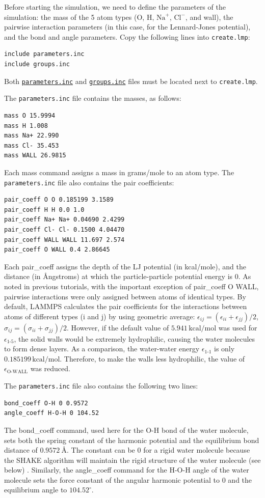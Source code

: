 \documentclass[9pt,tutorial]{livecoms}
\newcommand{\lmpcmd}[1]{\hspace{0pt}\colorbox{listing}{\textcolor{command}{\small{#1}}}\hspace{0pt}} %
\newcommand{\flecmd}[1]{\textcolor{command}{\texttt{#1}}} %
\newcommand{\dwlcmd}[1]{\textcolor{download}{\texttt{#1}}} %
\newcommand{\filepath}{https://raw.githubusercontent.com/lammpstutorials/lammpstutorials-article/main/files/}
\begin{document}
Before starting the simulation, we need to define the parameters of the
simulation: the mass of the 5 atom types (O, H, $\text{Na}^+$, $\text{Cl}^-$,
and wall), the pairwise interaction parameters (in this case, for the
Lennard-Jones potential), and the bond and angle parameters.  Copy the following
lines into \flecmd{create.lmp}:
\begin{lstlisting}
include parameters.inc
include groups.inc
\end{lstlisting}
Both \href{\filepath tutorial4/parameters.inc}{\dwlcmd{parameters.inc}}
and \href{\filepath tutorial4/groups.inc}{\dwlcmd{groups.inc}} files
must be located next to \flecmd{create.lmp}.

The \flecmd{parameters.inc} file contains the masses, as follows:
\begin{lstlisting}
mass O 15.9994
mass H 1.008
mass Na+ 22.990
mass Cl- 35.453
mass WALL 26.9815
\end{lstlisting}
Each \lmpcmd{mass} command assigns a mass in grams/mole to an atom type.
The \flecmd{parameters.inc} file also contains the pair coefficients:
\begin{lstlisting}
pair_coeff O O 0.185199 3.1589
pair_coeff H H 0.0 1.0
pair_coeff Na+ Na+ 0.04690 2.4299
pair_coeff Cl- Cl- 0.1500 4.04470
pair_coeff WALL WALL 11.697 2.574
pair_coeff O WALL 0.4 2.86645
\end{lstlisting}
Each \lmpcmd{pair\_coeff} assigns the depth of the LJ potential
(in kcal/mole), and the distance (in Ångstroms) at which the particle-particle
potential energy is 0.  As noted in previous tutorials, with the important exception of
\lmpcmd{pair\_coeff O WALL}, pairwise interactions were only assigned between
atoms of identical types.  By default, LAMMPS calculates the pair coefficients for the
interactions between atoms of different types (i and j) by using geometric average:
$\epsilon_{ij} = (\epsilon_{ii} + \epsilon_{jj})/2$,  $\sigma_{ij} = (\sigma_{ii} + \sigma_{jj})/2$.
However, if the default value of $5.941\,\text{kcal/mol}$ was used for $\epsilon_\text{1-5}$, the solid
walls would be extremely hydrophilic, causing the water molecules to form dense layers.  As a
comparison, the water-water energy $\epsilon_\text{1-1}$ is only $0.185199\,\text{kcal/mol}$.
Therefore, to make the walls less hydrophilic, the value of $\epsilon_\text{O-WALL}$
was reduced.

The \flecmd{parameters.inc} file also contains the following two lines:
\begin{lstlisting}
bond_coeff O-H 0 0.9572
angle_coeff H-O-H 0 104.52
\end{lstlisting}
The \lmpcmd{bond\_coeff} command, used here for the O-H bond of the water
molecule, sets both the spring constant of the harmonic potential and the
equilibrium bond distance of $0.9572~\text{\AA{}}$.  The constant can be 0 for a
rigid water molecule because the SHAKE algorithm will maintain the rigid
structure of the water molecule (see below) \cite{ryckaert1977numerical, andersen1983rattle}.
Similarly, the \lmpcmd{angle\_coeff} command for the H-O-H angle of the water molecule sets
the force constant of the angular harmonic potential to 0 and the equilibrium
angle to $104.52^\circ$.
\end{document}
